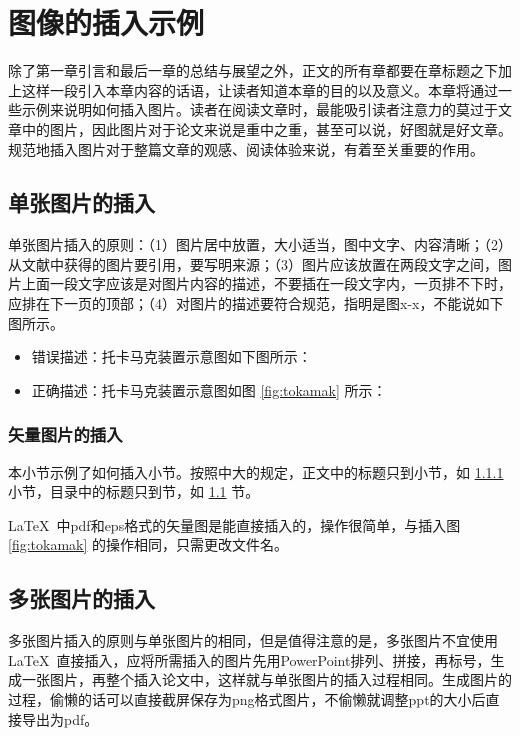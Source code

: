 \chapter{图像的插入示例}
\label{cha:fig_example}
除了第一章引言和最后一章的总结与展望之外，正文的所有章都要在章标题之下加上这样一段引入本章内容的话语，让读者知道本章的目的以及意义。本章将通过一些示例来说明如何插入图片。读者在阅读文章时，最能吸引读者注意力的莫过于文章中的图片，因此图片对于论文来说是重中之重，甚至可以说，好图就是好文章。规范地插入图片对于整篇文章的观感、阅读体验来说，有着至关重要的作用。
\section{单张图片的插入}
\label{sec:fig_singlefig}
单张图片插入的原则：（1）图片居中放置，大小适当，图中文字、内容清晰；（2）从文献中获得的图片要引用，要写明来源；（3）图片应该放置在两段文字之间，图片上面一段文字应该是对图片内容的描述，不要插在一段文字内，一页排不下时，应排在下一页的顶部；（4）对图片的描述要符合规范，指明是图x-x，不能说如下图所示。
\begin{itemize}
\item 错误描述：托卡马克装置示意图如下图所示\cite{xu2016general}：
\item 正确描述：托卡马克装置示意图如图 \ref{fig:tokamak} 所示\cite{xu2016general}：
\end{itemize}


\subsection{矢量图片的插入}
\label{ssec:fig_vecfig}
本小节示例了如何插入小节。按照中大的规定，正文中的标题只到小节，如 \ref{ssec:fig_vecfig} 小节，目录中的标题只到节，如 \ref{sec:fig_singlefig} 节。

\LaTeX\  中pdf和eps格式的矢量图是能直接插入的，操作很简单，与插入图 \ref{fig:tokamak} 的操作相同，只需更改文件名。

\section{多张图片的插入}
\label{sec:fig_multifig}
多张图片插入的原则与单张图片的相同，但是值得注意的是，多张图片不宜使用\LaTeX\ 直接插入，应将所需插入的图片先用PowerPoint排列、拼接，再标号，生成一张图片，再整个插入论文中，这样就与单张图片的插入过程相同。生成图片的过程，偷懒的话可以直接截屏保存为png格式图片，不偷懒就调整ppt的大小后直接导出为pdf。

